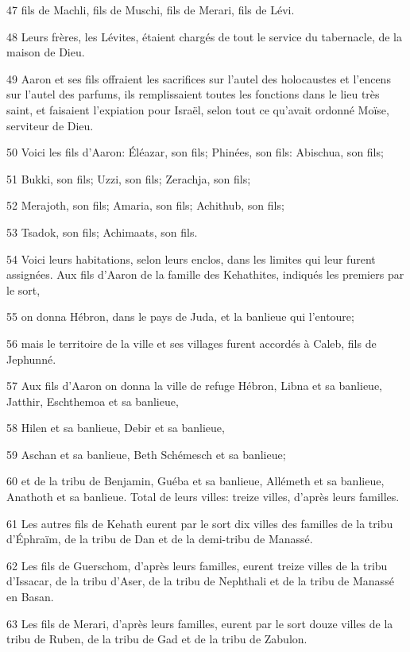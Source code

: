 \par 47 fils de Machli, fils de Muschi, fils de Merari, fils de Lévi.
\par 48 Leurs frères, les Lévites, étaient chargés de tout le service du tabernacle, de la maison de Dieu.
\par 49 Aaron et ses fils offraient les sacrifices sur l'autel des holocaustes et l'encens sur l'autel des parfums, ils remplissaient toutes les fonctions dans le lieu très saint, et faisaient l'expiation pour Israël, selon tout ce qu'avait ordonné Moïse, serviteur de Dieu.
\par 50 Voici les fils d'Aaron: Éléazar, son fils; Phinées, son fils: Abischua, son fils;
\par 51 Bukki, son fils; Uzzi, son fils; Zerachja, son fils;
\par 52 Merajoth, son fils; Amaria, son fils; Achithub, son fils;
\par 53 Tsadok, son fils; Achimaats, son fils.
\par 54 Voici leurs habitations, selon leurs enclos, dans les limites qui leur furent assignées. Aux fils d'Aaron de la famille des Kehathites, indiqués les premiers par le sort,
\par 55 on donna Hébron, dans le pays de Juda, et la banlieue qui l'entoure;
\par 56 mais le territoire de la ville et ses villages furent accordés à Caleb, fils de Jephunné.
\par 57 Aux fils d'Aaron on donna la ville de refuge Hébron, Libna et sa banlieue, Jatthir, Eschthemoa et sa banlieue,
\par 58 Hilen et sa banlieue, Debir et sa banlieue,
\par 59 Aschan et sa banlieue, Beth Schémesch et sa banlieue;
\par 60 et de la tribu de Benjamin, Guéba et sa banlieue, Allémeth et sa banlieue, Anathoth et sa banlieue. Total de leurs villes: treize villes, d'après leurs familles.
\par 61 Les autres fils de Kehath eurent par le sort dix villes des familles de la tribu d'Éphraïm, de la tribu de Dan et de la demi-tribu de Manassé.
\par 62 Les fils de Guerschom, d'après leurs familles, eurent treize villes de la tribu d'Issacar, de la tribu d'Aser, de la tribu de Nephthali et de la tribu de Manassé en Basan.
\par 63 Les fils de Merari, d'après leurs familles, eurent par le sort douze villes de la tribu de Ruben, de la tribu de Gad et de la tribu de Zabulon.
